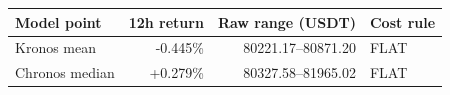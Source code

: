 \begin{tabular}{lrrl}
\toprule
Model point & 12h return & Raw range (USDT) & Cost rule \\
\midrule
Kronos mean & -0.445\% & 80221.17--80871.20 & FLAT \\
Chronos median & +0.279\% & 80327.58--81965.02 & FLAT \\
\bottomrule
\end{tabular}
